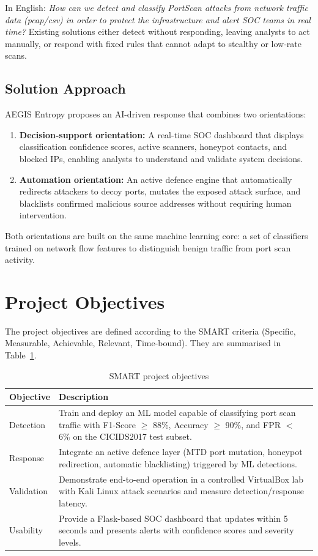 \documentclass[12pt,a4paper]{report}
\begin{document}
In English: \textit{How can we detect and classify PortScan attacks from network traffic data (pcap/csv) in order to protect the infrastructure and alert SOC teams in real time?} Existing solutions either detect without responding, leaving analysts to act manually, or respond with fixed rules that cannot adapt to stealthy or low-rate scans.

\subsection{Solution Approach}

AEGIS Entropy proposes an AI-driven response that combines two orientations:

\begin{enumerate}
    \item \textbf{Decision-support orientation:} A real-time SOC dashboard that displays classification confidence scores, active scanners, honeypot contacts, and blocked IPs, enabling analysts to understand and validate system decisions.
    \item \textbf{Automation orientation:} An active defence engine that automatically redirects attackers to decoy ports, mutates the exposed attack surface, and blacklists confirmed malicious source addresses without requiring human intervention.
\end{enumerate}

Both orientations are built on the same machine learning core: a set of classifiers trained on network flow features to distinguish benign traffic from port scan activity.

\section{Project Objectives}

The project objectives are defined according to the SMART criteria (Specific, Measurable, Achievable, Relevant, Time-bound). They are summarised in Table~\ref{tab:objectives}.

\begin{table}[H]
\centering
\caption{SMART project objectives}
\label{tab:objectives}
\begin{tabularx}{\textwidth}{lX}
\toprule
\textbf{Objective} & \textbf{Description} \\
\midrule
Detection & Train and deploy an ML model capable of classifying port scan traffic with F1-Score $\geq$ 88\%, Accuracy $\geq$ 90\%, and FPR $<$ 6\% on the CICIDS2017 test subset. \\
Response & Integrate an active defence layer (MTD port mutation, honeypot redirection, automatic blacklisting) triggered by ML detections. \\
Validation & Demonstrate end-to-end operation in a controlled VirtualBox lab with Kali Linux attack scenarios and measure detection/response latency. \\
Usability & Provide a Flask-based SOC dashboard that updates within 5 seconds and presents alerts with confidence scores and severity levels. \\
\bottomrule
\end{tabularx}
\end{table}
\end{document}
